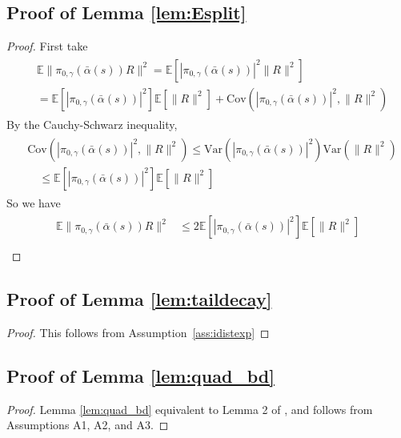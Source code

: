 \documentclass[journal,onecolumn]{IEEEtran}
\newcommand{\CE}{\mathbb{E}}
\newcommand{\alsbar}{\bar{\alpha}(s)}
\newcommand{\ids}{\pi}
\newcommand{\idw}{\gamma}
\newcommand{\isp}{0,\idw}
\newcommand{\idistrw}{\ids_{\isp}}
\begin{document}
{\subsection*{Proof of Lemma \ref{lem:Esplit}}
\begin{proof}
First take 
\begin{align*}
\begin{split}
&\CE \|\idistrw(\alsbar)R\|^2 = \CE \left[|\idistrw(\alsbar)|^2\|R\|^2 \right] \\ & = \CE \left[|\idistrw(\alsbar)|^2\right] \CE \left[\|R\|^2\right] + \textrm{Cov}\left(|\idistrw(\alsbar)|^2, \|R\|^2\right)
\end{split}
\end{align*}
By the Cauchy-Schwarz inequality,
\begin{align*}
    \begin{split}
        &\textrm{Cov}\left(|\idistrw(\alsbar)|^2, \|R\|^2\right) \leq \textrm{Var}\left(|\idistrw(\alsbar)|^2\right)\textrm{Var}\left(\|R\|^2\right) \\
        & \quad \leq \CE \left[|\idistrw(\alsbar)|^2\right] \CE \left[\|R\|^2\right]
    \end{split}
\end{align*}
So we have 
\begin{align}
\begin{split}
\label{eq:ttbound}
\CE \|\idistrw(\alsbar)R\|^2 &\leq 2\CE \left[|\idistrw(\alsbar)|^2\right] \CE \left[\|R\|^2\right] \\
\end{split}
\end{align}
\end{proof}

\subsection*{Proof of Lemma \ref{lem:taildecay}}
\begin{proof}
    This follows from Assumption~\ref{ass:idistexp}
\end{proof}

\subsection*{Proof of Lemma \ref{lem:quad_bd}}
\begin{proof}
Lemma \ref{lem:quad_bd} equivalent to Lemma 2 of \cite{raginsky2017non}, and follows from Assumptions A1, A2, and A3. 
\end{proof}

}
\end{document}

